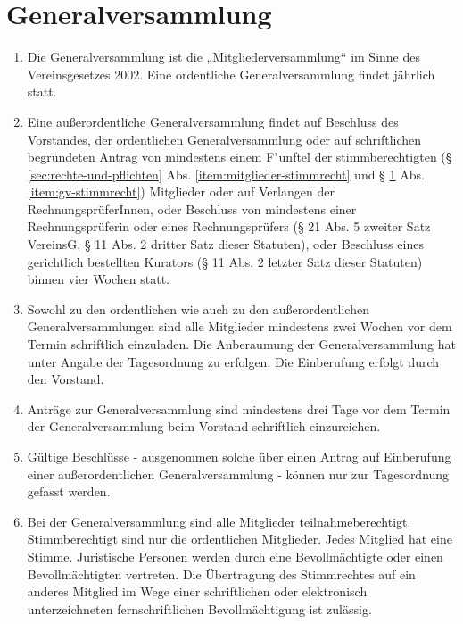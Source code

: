 \documentclass[a4paper,12pt]{article}
\newcommand{\comment}[1]{{\bf /*Komm.:} \textit{#1} {\bf */}}
\def\comment#1{}
\begin{document}
\section{Generalversammlung} %
\label{sec:generalversammlung}
\begin{enumerate}
\item Die Generalversammlung ist die „Mitgliederversammlung“ im Sinne des Vereinsgesetzes 2002. Eine ordentliche Generalversammlung findet jährlich statt.
\item Eine außerordentliche Generalversammlung findet auf Beschluss des Vorstandes, der ordentlichen Generalversammlung oder
auf schriftlichen begründeten Antrag von mindestens einem F"unftel der stimmberechtigten (§ \ref{sec:rechte-und-pflichten} Abs. \ref{item:mitglieder-stimmrecht} und § \ref{sec:generalversammlung} Abs. \ref{item:gv-stimmrecht}) Mitglieder
oder auf Verlangen der RechnungsprüferInnen, oder
Beschluss von mindestens einer Rechnungspr\"uferin oder eines Rechnungspr\"ufers (§ 21 Abs. 5 zweiter Satz VereinsG, § 11 Abs. 2 dritter Satz dieser Statuten), oder Beschluss eines gerichtlich bestellten Kurators (§ 11 Abs. 2 letzter Satz dieser Statuten)
binnen vier Wochen statt. \comment{die 2 zusätzlichen Möglichkeiten wie BMI orig. dabei}
\item Sowohl zu den ordentlichen wie auch zu den außerordentlichen Generalversammlungen sind alle Mitglieder mindestens zwei Wochen vor dem Termin schriftlich einzuladen. Die Anberaumung der Generalversammlung hat unter Angabe der Tagesordnung zu erfolgen. Die Einberufung erfolgt durch den Vorstand.
\comment{... oder durch die/einen Rechnungsprüfer (Abs. 2 lit. d) oder durch einen gerichtlich bestellten Kurator (Abs. 2 lit. e) ...}

\item Anträge zur Generalversammlung sind mindestens drei Tage vor dem Termin der Generalversammlung beim Vorstand schriftlich einzureichen.

\item Gültige Beschlüsse - ausgenommen solche über einen Antrag auf Einberufung einer außerordentlichen Generalversammlung - können nur zur Tagesordnung gefasst werden.

\item \label{item:gv-stimmrecht} Bei der Generalversammlung sind alle Mitglieder teilnahmeberechtigt.
Stimmberechtigt sind nur die ordentlichen Mitglieder.
Jedes Mitglied hat eine Stimme.
Juristische Personen werden durch eine Bevollm\"achtigte oder einen Bevollm\"achtigten vertreten.
Die Übertragung des Stimmrechtes auf ein anderes Mitglied im Wege einer schriftlichen oder elektronisch unterzeichneten fernschriftlichen Bevollmächtigung ist zulässig.


\end{enumerate}
\end{document}
